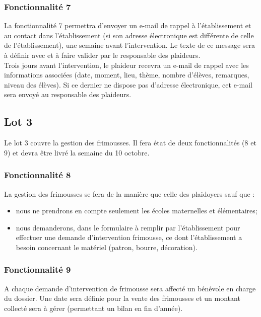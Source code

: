 \subsubsection{Fonctionnalité 7}
La fonctionnalité 7 permettra d'envoyer un e-mail de rappel à l'établissement et au contact dans l'établissement (si son adresse électronique est différente de celle de l'établissement), une semaine avant l'intervention. Le texte de ce message sera à définir avec \nomClient{} et à faire valider par le responsable des plaideurs. \\
Trois jours avant l'intervention, le plaideur recevra un e-mail de rappel avec les informations associées (date, moment, lieu, thème, nombre d'élèves, remarques, niveau des élèves). Si ce dernier ne dispose pas d'adresse électronique, cet e-mail sera envoyé au responsable des plaideurs. 
\\
\subsection{Lot 3}

Le lot 3 couvre la gestion des frimousses. Il fera état de deux fonctionnalités (8 et 9) et devra être livré la semaine du 10 octobre.
\\

\subsubsection{Fonctionnalité 8}
La gestion des frimousses se fera de la manière que celle des plaidoyers sauf que :
\begin{itemize}
\item nous ne prendrons en compte seulement les écoles maternelles et élémentaires;
\item nous demanderons, dans le formulaire à remplir par l'établissement pour effectuer une demande d'intervention frimousse, ce dont l'établissement a besoin concernant le matériel (patron, bourre, décoration). \\
\end{itemize}

\subsubsection{Fonctionnalité 9}
A chaque demande d'intervention de frimousse sera affecté un bénévole en charge du dossier. Une date sera définie pour la vente des frimousses et un montant collecté sera à gérer (permettant un bilan en fin d'année).
\\

